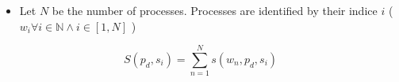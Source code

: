 \documentclass{article}
\begin{document}
    \begin{itemize}
        \item Let $ N $ be the number of processes.
              Processes are identified by their indice $ i $ ($ w_{i} \forall{i} \in \mathbb{N} \land i \in [1, N] $ )
    \end{itemize}

    \begin{equation} \label{eqn1}
        S(p_{d}, s_{i}) = \sum_{n=1}^{N} s(w_{n}, p_{d}, s_{i})
    \end{equation}
\end{document}
